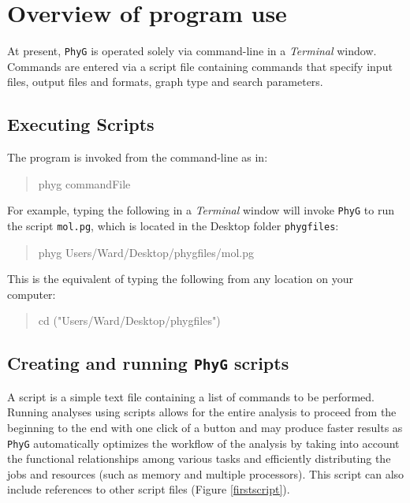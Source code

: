 \documentclass[11pt]{book}
\newcommand{\phyg}{\texttt{PhyG} }
\begin{document}
{{		%
		
	\section{Overview of program use}
	
		At present, \phyg is operated solely via command-line in a \textit{Terminal} window. 
		Commands are entered via a script file containing commands that specify input files, 
		output files and formats, graph type and search parameters.
		
		\subsection{Executing Scripts}
		The program is invoked from the command-line as in:\\
		
		\begin{quote}
		phyg commandFile
		\end{quote}

		\noindent For example, typing the following in a \textit{Terminal} window will invoke 
		\phyg to run the script \texttt{mol.pg}, which is located in the Desktop folder \texttt{phygfiles}:\\
		
		\begin{quote}
  		phyg Users/Ward/Desktop/phygfiles/mol.pg
		\end{quote}

		\noindent 
		This is the equivalent of typing the following from any location on your computer:\\
		
		\begin{quote}
   		cd ("Users/Ward/Desktop/phygfiles")
		\end{quote}
			
		\subsection{Creating and running \phyg scripts}
		A script is a simple text file containing a list of commands to be performed. Running 
		analyses using scripts allows for the entire analysis to proceed from the beginning to 
		the end with one click of a button and may produce faster results as \phyg automatically 
		optimizes the workflow of the analysis by taking into account the functional relationships 
		among various tasks and efficiently distributing the jobs and resources (such as memory 
		and multiple processors). This script 	can also include references to other script files 
		(Figure \ref{firstscript}).
		
}}
\end{document}
